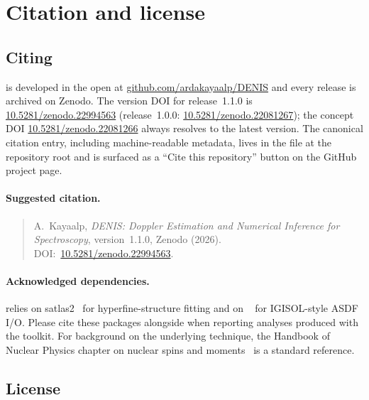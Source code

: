 \section{Citation and license}
\label{sec:citation}

\subsection{Citing \denis{}}

\denis{} is developed in the open at
\href{https://github.com/ardakayaalp/DENIS}{github.com/ardakayaalp/DENIS}
and every release is archived on Zenodo. The version DOI for
release~1.1.0 is
\href{https://doi.org/10.5281/zenodo.22994563}{10.5281/zenodo.22994563} (release~1.0.0:
\href{https://doi.org/10.5281/zenodo.22081267}{10.5281/zenodo.22081267});
the concept DOI
\href{https://doi.org/10.5281/zenodo.22081266}{10.5281/zenodo.22081266}
always resolves to the latest version. The canonical citation entry,
including machine-readable metadata, lives in the 
file at the repository root and is surfaced as a ``Cite this
repository'' button on the GitHub project page.

\paragraph{Suggested citation.}
\begin{quote}
    A.~Kayaalp, \emph{DENIS: Doppler Estimation and Numerical
    Inference for Spectroscopy}, version~1.1.0, Zenodo (2026).
    DOI:~\href{https://doi.org/10.5281/zenodo.22994563}%
    {10.5281/zenodo.22994563}.
\end{quote}

\paragraph{Acknowledged dependencies.}
\denis{} relies on satlas2~\cite{satlas2} for hyperfine-structure
fitting and on ~\cite{clstools} for IGISOL-style
ASDF I/O. Please cite these packages alongside \denis{} when
reporting analyses produced with the toolkit. For background on the
underlying technique, the Handbook of Nuclear Physics chapter on
nuclear spins and moments~\cite{cls_handbook} is a standard
reference.

\subsection{License}

